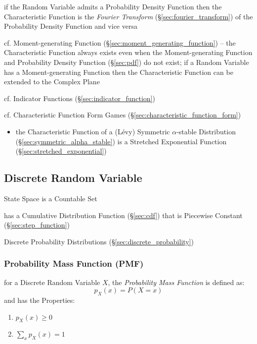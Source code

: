 if the Random Variable admits a Probability Density Function then the
Characteristic Function is the \emph{Fourier Transform}
(\S\ref{sec:fourier_transform}) of the Probability Density Function and vice
versa

cf. Moment-generating Function (\S\ref{sec:moment_generating_function}) --
the Characteristic Function always exists even when the Moment-generating
Function and Probability Density Function (\S\ref{sec:pdf}) do not exist;
if a Random Variable has a Moment-generating Function then the Characteristic
Function can be extended to the Complex Plane

\fist cf. Indicator Functions (\S\ref{sec:indicator_function})

cf. Characteristic Function Form Games
(\S\ref{sec:characteristic_function_form})

\begin{itemize}
  \item the Characteristic Function of a (L\'evy) Symmetric $\alpha$-stable
    Distribution (\S\ref{sec:symmetric_alpha_stable}) is a Stretched Exponential
    Function (\S\ref{sec:stretched_exponential})
\end{itemize}



\subsection{Discrete Random Variable}\label{sec:discrete_random_variable}

State Space is a Countable Set

has a Cumulative Distribution Function (\S\ref{sec:cdf}) that is Piecewise
Constant (\S\ref{sec:step_function})

\fist Discrete Probability Distributions (\S\ref{sec:discrete_probability})



\subsubsection{Probability Mass Function (PMF)}\label{sec:pmf}

for a Discrete Random Variable $X$, the \emph{Probability Mass Function} is
defined as:
\[
  p_X(x) = P(X = x)
\]
and has the Properties:
\begin{enumerate}
  \item $p_X(x) \geq 0$
  \item $\sum_x p_X(x) = 1$
\end{enumerate}

